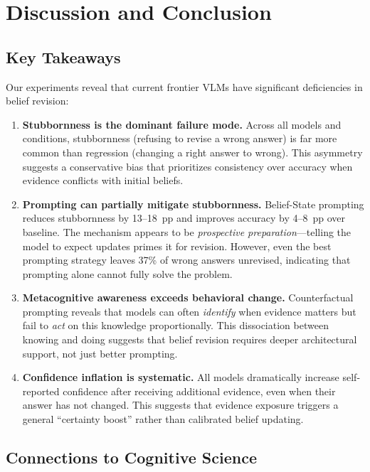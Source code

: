 \section{Discussion and Conclusion}
\label{sec:conclusion}

\subsection{Key Takeaways}

Our experiments reveal that current frontier VLMs have significant deficiencies in belief revision:

\begin{enumerate}[leftmargin=*, nosep]
    \item \textbf{Stubbornness is the dominant failure mode.}  Across all models and conditions, stubbornness (refusing to revise a wrong answer) is far more common than regression (changing a right answer to wrong).  This asymmetry suggests a conservative bias that prioritizes consistency over accuracy when evidence conflicts with initial beliefs.
    
    \item \textbf{Prompting can partially mitigate stubbornness.}  Belief-State prompting reduces stubbornness by 13--18~pp and improves accuracy by 4--8~pp over baseline.  The mechanism appears to be \emph{prospective preparation}---telling the model to expect updates primes it for revision.  However, even the best prompting strategy leaves 37\% of wrong answers unrevised, indicating that prompting alone cannot fully solve the problem.
    
    \item \textbf{Metacognitive awareness exceeds behavioral change.}  Counterfactual prompting reveals that models can often \emph{identify} when evidence matters but fail to \emph{act} on this knowledge proportionally.  This dissociation between knowing and doing suggests that belief revision requires deeper architectural support, not just better prompting.
    
    \item \textbf{Confidence inflation is systematic.}  All models dramatically increase self-reported confidence after receiving additional evidence, even when their answer has not changed.  This suggests that evidence exposure triggers a general ``certainty boost'' rather than calibrated belief updating.
\end{enumerate}

\subsection{Connections to Cognitive Science}

